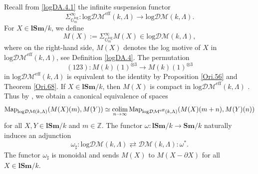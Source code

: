\documentclass[11pt, a4paper]{amsart}
\theoremstyle{definition}
\numberwithin{equation}{subsection}
\newcommand{\Sm}{\mathbf{Sm}}
\newcommand{\lSm}{\mathbf{lSm}}
\newcommand{\colimit}{\mathop{\rm colim}}
\newcommand{\Gmm}{\mathbb{G}_m^{\mathrm{log}}}
\newcommand{\Map}{\operatorname{Map}}
\newcommand{\inflogDM}{\mathrm{log}\mathcal{DM}}
\newcommand{\inflogDMeff}{\mathrm{log}\mathcal{DM}^{\mathrm{eff}}}
\newcommand{\infDM}{\mathcal{DM}}
\begin{document}
\

Recall from \eqref{logDA.4.1} the infinite suspension functor
\[
\Sigma_{\Gmm}^\infty
\colon
\inflogDMeff(k,\Lambda)
\to
\inflogDM(k,\Lambda).
\]
For $X\in \lSm/k$, we define
\[
M(X)
:=
\Sigma_{\Gmm}^\infty M(X)\in \inflogDM(k,\Lambda),
\]
where on the right-hand side, 
$M(X)$ denotes the log motive of $X$ in $\inflogDMeff(k,\Lambda)$, 
see Definition \ref{logDA.4}.
The permutation
$$
(123)\colon M(k)(1)^{\otimes 3}\to M(k)(1)^{\otimes 3}
$$ 
in $\inflogDMeff(k,\Lambda)$ is equivalent to the identity by Proposition \ref{Ori.56} and Theorem \ref{Ori.68}.
If $X\in \lSm/k$, then $M(X)$ is compact in $\inflogDMeff(k,\Lambda)$ \cite[Remark 5.2.6]{logDM}.
Thus by \cite[Th\'eor\`emes 4.3.61, 4.3.79]{Ayo07}, 
we obtain a canonical equivalence of spaces
\begin{equation}
\label{ML.0.1}
\Map_{\inflogDM(k,\Lambda)}(M(X)(m),M(Y))
\simeq
\colimit_{n\to \infty}\Map_{\inflogDMeff(k,\Lambda)}(M(X)(m+n),M(Y)(n))
\end{equation}
for all $X,Y\in \lSm/k$ and $m\in\mathbb{Z}$.
The functor $\omega\colon \lSm/k\to \Sm/k$ naturally induces an adjunction
\[
\omega_\sharp
:
\inflogDM(k,\Lambda)
\rightleftarrows
\infDM(k,\Lambda)
:
\omega^*.
\]
The functor $\omega_\sharp$ is monoidal and sends $M(X)$ to $M(X-\partial X)$ for all $X\in \lSm/k$.
\end{document}
